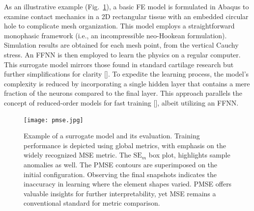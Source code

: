 \documentclass[12pt,a4paper]{report}
\begin{document}
As an illustrative example (Fig.~\ref{basic_surrogate}), a basic FE model is formulated in Abaqus to examine contact mechanics in a 2D rectangular tissue with an embedded circular hole to complicate mesh organization. This model employs a straightforward monophasic framework (i.e., an incompressible neo-Hookean formulation). Simulation results are obtained for each mesh point, from the vertical Cauchy stress. An FFNN is then employed to learn the physics on a regular computer. This surrogate model mirrors those found in standard cartilage research but further simplifications for clarity [\cite{paiva2012,arbabi2016a,arbabi2016b}]. To expedite the learning process, the model's complexity is reduced by incorporating a single hidden layer that contains a mere fraction of the neurons compared to the final layer. This approach parallels the concept of reduced-order models for fast training [\cite{pant2021}], albeit utilizing an FFNN.
%
\begin{figure}
\texttt{[image: pmse.jpg]}
\caption{Example of a surrogate model and its evaluation. Training performance is depicted using global metrics, with emphasis on the widely recognized MSE metric. The \( \textrm{SE}_m \) box plot, highlights sample anomalies as well. The PMSE contours are superimposed on the initial configuration. Observing the final snapshots indicates the inaccuracy in learning where the element shapes varied. PMSE offers valuable insights for further interpretability, yet MSE remains a conventional standard for metric comparison.}
\label{basic_surrogate}
\end{figure}
\end{document}
